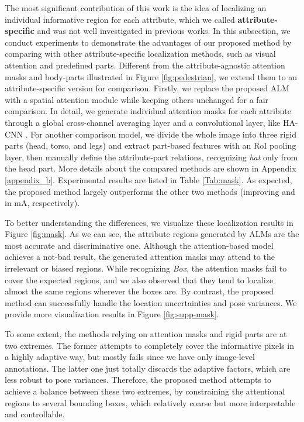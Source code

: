 \documentclass[10pt,twocolumn,letterpaper]{article}
\begin{document}
The most significant contribution of this work is the idea of localizing an individual informative region for each attribute, which we called \textbf{attribute-specific} and was not well investigated in previous works.
In this subsection, we conduct experiments to demonstrate the advantages of our proposed method by comparing with other attribute-specific localization methods, such as visual attention and predefined parts.
Different from the attribute-agnostic attention masks and body-parts illustrated in Figure \ref{fig:pedestrian}, we extend them to an attribute-specific version for comparison.
Firstly, we replace the proposed ALM with a spatial attention module while keeping others unchanged for a fair comparison.
In detail, we generate individual attention masks for each attribute through a global cross-channel averaging layer and a  convolutional layer, like HA-CNN \cite{li2018harmonious}.
For another comparison model, we divide the whole image into three rigid parts (head, torso, and legs) and extract part-based features with an RoI pooling layer, then manually define the attribute-part relations, \eg recognizing \textit{hat} only from the head part.
More details about the compared methods are shown in Appendix \ref{appendix_b}.
Experimental results are listed in Table \ref{Tab:mask}.
As expected, the proposed method largely outperforms the other two methods (improving  and  in mA, respectively).

To better understanding the differences, we visualize these localization results in Figure \ref{fig:mask}.
As we can see, the attribute regions generated by ALMs are the most accurate and discriminative one.
Although the attention-based model achieves a not-bad result, the generated attention masks may attend to the irrelevant or biased regions.
While recognizing \textit{Box}, the attention masks fail to cover the expected regions, and we also observed that they tend to localize almost the same regions wherever the boxes are.
By contrast, the proposed method can successfully handle the location uncertainties and pose variances. We provide more visualization results in Figure \ref{fig:supp-mask}.

To some extent, the methods relying on attention masks and rigid parts are at two extremes.
The former attempts to completely cover the informative pixels in a highly adaptive way, but mostly fails since we have only image-level annotations.
The latter one just totally discards the adaptive factors, which are less robust to pose variances.
Therefore, the proposed method attempts to achieve a balance between these two extremes, by constraining the attentional regions to several bounding boxes, which relatively coarse but more interpretable and controllable.
\end{document}
